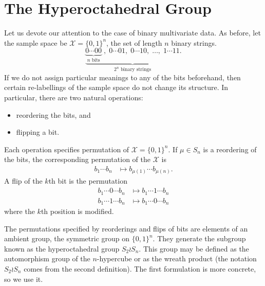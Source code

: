 \documentclass[cclicense]{hmcthesis}
\providecommand*{\xs}{\mathcal X}
\numberwithin{equation}{chapter}
\numberwithin{thmcounter}{chapter}
\begin{document}
\section{The Hyperoctahedral Group}
    Let us devote our attention to the case of binary multivariate data.  As
    before, let the sample space be $\xs = \{0, 1\}^n$, the set of length $n$
    binary strings.
    \[
        \underbrace{
        \underbrace{0\cdots00}_\text{$n$ bits}\;,\;
        0\cdots01,\;
        0\cdots10,\;
        \ldots,\;
        1\cdots11
        }_\text{$2^n$ binary strings}.
    \]
    If we do not assign particular meanings to any of the bits beforehand, then
    certain re-labellings of the sample space do not change its structure.  In
    particular, there are two natural operations:
    \begin{itemize}\nospace
    \item reordering the bits, and
    \item flipping a bit.
    \end{itemize}
    Each operation specifies permutation of $\xs = \{0, 1\}^n$.  If $\mu \in
    S_n$ is a reordering of the bits, the corresponding permutation of the
    $\xs$  is
    \begin{align*}
        b_1 \cdots b_n &\mapsto b_{\mu(1)} \cdots b_{\mu(n)}.
    \end{align*}
    A flip of the $k$th bit is the permutation
    \begin{align*}
        b_1 \cdots 0 \cdots b_n 
        &\mapsto
        b_1 \cdots 1 \cdots b_n  \\
        b_1 \cdots 1 \cdots b_n 
        &\mapsto
        b_1 \cdots 0 \cdots b_n
    \end{align*}
    where the $k$th position is modified.  
    
    The permutations specified by reorderings and flips of bits are elements of
    an ambient group, the symmetric group on $\{0, 1\}^n$.  They generate the
    subgroup known as the hyperoctahedral group $S_2 \wr S_n$.  This group may
    be defined as the automorphism group of the $n$-hypercube or as the wreath
    product (the notation $S_2 \wr S_n$ comes from the second definition).  The
    first formulation is more concrete, so we use it.
\end{document}

